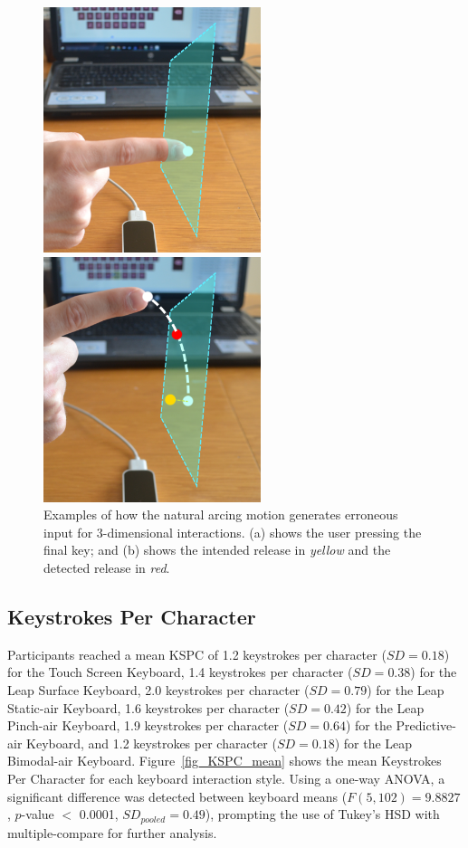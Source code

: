\begin{figure}[!t]
	\centering
	\begin{minipage}[t]{2.5in}
		\includegraphics[width=2.5in]{Figures/fig_arc_down}
	\end{minipage}
	\begin{minipage}[t]{2.5in}
		\includegraphics[width=2.5in]{Figures/fig_arc_up}
	\end{minipage}
	\caption[Arcing Motion]{Examples of how the natural arcing motion generates erroneous input for 3-dimensional interactions. (a) shows the user pressing the final key; and (b) shows the intended release in \textit{yellow} and the detected release in \textit{red}.}
	\label{arcing_motion}
\end{figure}

\subsection{Keystrokes Per Character}
Participants reached a mean KSPC of 1.2 keystrokes per character ($SD = 0.18$) for the Touch Screen Keyboard, 1.4 keystrokes per character  ($SD = 0.38$) for the Leap Surface Keyboard, 2.0 keystrokes per character ($SD = 0.79$) for the Leap Static-air Keyboard, 1.6 keystrokes per character ($SD = 0.42$) for the Leap Pinch-air Keyboard, 1.9 keystrokes per character ($SD = 0.64$) for the Predictive-air Keyboard, and 1.2 keystrokes per character ($SD = 0.18$) for the Leap Bimodal-air Keyboard. Figure~\ref{fig_KSPC_mean} shows the mean Keystrokes Per Character for each keyboard interaction style. Using a one-way ANOVA, a significant difference was detected between keyboard means ($F(5, 102) = 9.8827$, $p$-value $<$ 0.0001, $SD_{pooled} = 0.49$), prompting the use of Tukey's HSD with multiple-compare for further analysis.

